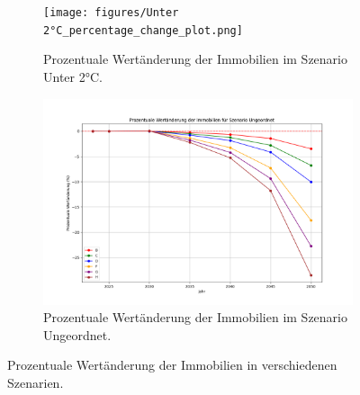 \begin{figure}[htbp]
    \vspace{1em}
    
    \begin{subfigure}[b]{0.48\textwidth}
        \centering
        \texttt{[image: figures/Unter 2°C\_percentage\_change\_plot.png]}
        \caption{Prozentuale Wertänderung der Immobilien im Szenario Unter 2°C.}
        \label{fig:unter_2c}
    \end{subfigure}
    \hfill
    \begin{subfigure}[b]{0.48\textwidth}
        \centering
        \includegraphics[width=\textwidth]{figures/Ungeordnet_percentage_change_plot.png}
        \caption{Prozentuale Wertänderung der Immobilien im Szenario Ungeordnet.}
        \label{fig:ungeordnet}
    \end{subfigure}
    \caption{Prozentuale Wertänderung der Immobilien in verschiedenen Szenarien.}
    \label{fig:all_scenarios}
\end{figure}